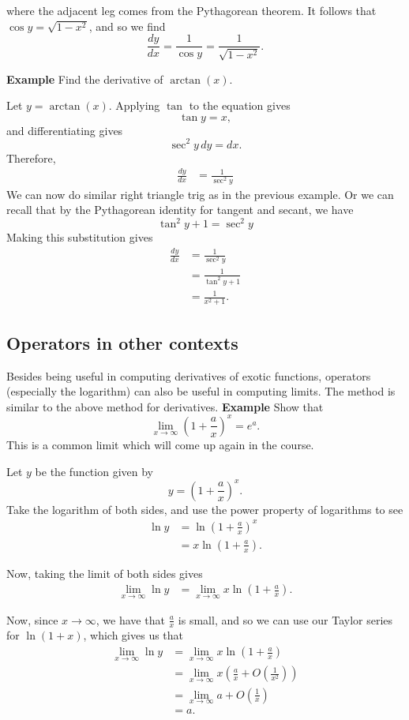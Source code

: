 \documentclass[twoside,openright,titlepage,a4paper]{book}
\begin{document}
\begin{sloppypar}
\begin{examplebox}
where the adjacent leg comes from the Pythagorean theorem. It follows that $\cos y = \sqrt{1-x^2}$, and so we find \[ \frac{dy}{dx} = \frac{1}{\cos y} = \frac{1}{\sqrt{1-x^2}}. \]
\end{examplebox}
\bigbreak
\textbf{Example} Find the derivative of $\arctan(x)$.
\begin{examplebox}
Let $y = \arctan(x)$. Applying $\tan$ to the equation gives \[ \tan y = x, \] and differentiating gives \[ \sec^2y\,dy = dx. \]
Therefore,
\begin{align*}
\frac{dy}{dx} &= \frac{1}{\sec^2y}
\end{align*}
We can now do similar right triangle trig as in the previous example. Or we can recall that by the Pythagorean identity for tangent and secant, we have \[ \tan^2y + 1 = \sec^2y \] 
Making this substitution gives
\begin{align*}
\frac{dy}{dx} &= \frac{1}{\sec^2y} \\
&= \frac{1}{\tan^2y + 1} \\
&= \frac{1}{x^2+1}. 
\end{align*}
\end{examplebox}

\subsection{Operators in other contexts}
Besides being useful in computing derivatives of exotic functions, operators (especially the logarithm) can also be useful in computing limits. The method is similar to the above method for derivatives.
\bigbreak
\textbf{Example} Show that \[ \lim_{x \rightarrow \infty} \left(1+\frac{a}{x}\right)^x = e^a. \]
This is a common limit which will come up again in the course.
\begin{examplebox}
Let $y$ be the function given by \[ y = \left(1+\frac{a}{x}\right)^x. \]
Take the logarithm of both sides, and use the power property of logarithms to see
\begin{align*}
\ln y &= \ln \left(1+\frac{a}{x}\right)^x \\
&= x \ln \left(1+\frac{a}{x}\right).
\end{align*}

Now, taking the limit of both sides gives
\begin{align*}
\lim_{x \rightarrow \infty} \ln y &= \lim_{x \rightarrow \infty} x \ln \left(1+\frac{a}{x}\right).
\end{align*}

Now, since $x \rightarrow \infty$, we have that $\frac{a}{x}$ is small, and so we can use our Taylor series for $\ln(1+x)$, which gives us that
\begin{align*}
\lim_{x \rightarrow \infty} \ln y &= \lim_{x \rightarrow \infty} x \ln\left(1+\frac{a}{x}\right) \\
&= \lim_{x \rightarrow \infty} x \left(\frac{a}{x} + O\left(\frac{1}{x^2}\right) \right) \\
&= \lim_{x \rightarrow \infty} a + O \left(\frac{1}{x}\right) \\
&= a.
\end{align*}


\end{examplebox}
\end{sloppypar}
\end{document}
